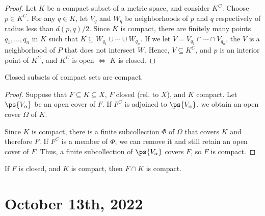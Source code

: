 \documentclass[11pt]{scrartcl}
\numberwithin{equation}{section}
\begin{document}
\begin{proof}
    Let $K$ be a compact subset of a metric space, and consider 
    $K^C$. Choose $p\in K^C$. For any $q\in K$, let $V_q$ and $W_q$ be 
    neighborhoods of $p$ and $q$ respectively of radius less than 
    $d(p,q)/2$.
    Since $K$ is compact, there are finitely many 
    points $q_1,\dots,q_n$ in $K$ such that $ K\subseteq W_{q_1}\cup \cdots\cup W_{q_n}$.
    If we let $V = V_{q_1}\cap \cdots\cap V_{q_n}$, the $V$ is a neighborhood of $P$ that does not intersect $W$.
    Hence, $V\subseteq K^C$, and $p$ is an interior point of $K^C$,
    and $K^C$ is open $\iff$ $K$ is closed.
\end{proof}

\begin{theorem}
    Closed subsets of compact sets are compact.
\end{theorem}

\begin{proof}
    Suppose that $F\subseteq K\subseteq X$, $F$ closed (rel. to $X$),
    and $K$ compact. Let $\ps{V_\alpha}$ be an open cover of $F$.
    If $F^C$ is adjoined to $\ps{V_\alpha}$, we obtain an open cover 
    $\Omega$ of $K$.

    Since $K$ is compact, there is a finite subcollection $\Phi$ of 
    $\Omega$ that covers $K$ and therefore $F$. If $F^C$ is a 
    member of $\Phi$, we can remove it and still retain an 
    open cover of $F$. Thus, a finite subcollection of $\ps{V_\alpha}$
    covers $F$, so $F$ is compact.
\end{proof}
\begin{corollary}
    If $F$ is closed, and $K$ is compact, then $F\cap K$ is compact.
\end{corollary}
\clearpage
\section{October 13th, 2022}
\end{document}
